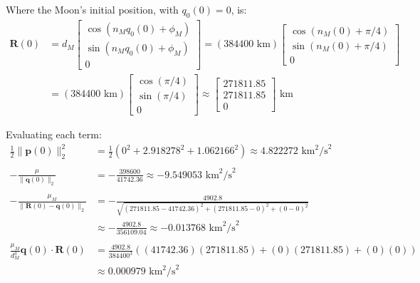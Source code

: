 \documentclass[titlepage]{article}
\begin{document}
Where the Moon's initial position, with $q_0(0)=0$, is:
\begin{equation}
	\begin{split}
		\boldsymbol{R}(0)&=d_M
		\begin{bmatrix}
			\cos(n_Mq_0(0)+\phi_M) \\
			\sin(n_Mq_0(0)+\phi_M) \\
			0
		\end{bmatrix}=(384400\text{ km})
		\begin{bmatrix}
			\cos(n_M(0)+\pi/4) \\
			\sin(n_M(0)+\pi/4) \\
			0
		\end{bmatrix} \\
		&=(384400\text{ km})
		\begin{bmatrix}
			\cos(\pi/4) \\
			\sin(\pi/4) \\
			0
		\end{bmatrix}\approx
		\begin{bmatrix}
			271811.85 \\
			271811.85 \\
			0
		\end{bmatrix}\text{ km}
	\end{split}
\end{equation}

Evaluating each term:
\begin{equation}
	\begin{split}
		\frac{1}{2}\|\boldsymbol{p}(0)\|_2^2&=\frac{1}{2}\left(0^2+2.918278^2+1.062166^2\right)\approx4.822272\text{ km}^2\text{/s}^2 \\
		\\
		-\frac{\mu}{\|\boldsymbol{q}(0)\|_2}&=-\frac{398600}{41742.36}\approx-9.549053\text{ km}^2\text{/s}^2 \\
		\\
		-\frac{\mu_M}{\|\boldsymbol{R}(0)-\boldsymbol{q}(0)\|_2}&=-\frac{4902.8}{\sqrt{(271811.85-41742.36)^2+(271811.85-0)^2+(0-0)^2}} \\
		&\approx-\frac{4902.8}{356109.04}\approx-0.013768\text{ km}^2\text{/s}^2 \\
		\\
		\frac{\mu_M}{d_M^3}\boldsymbol{q}(0)\cdot\boldsymbol{R}(0)&=\frac{4902.8}{384400^3}\left((41742.36)(271811.85)+(0)(271811.85)+(0)(0)\right) \\
		&\approx0.000979\text{ km}^2\text{/s}^2
	\end{split}
\end{equation}
\end{document}
